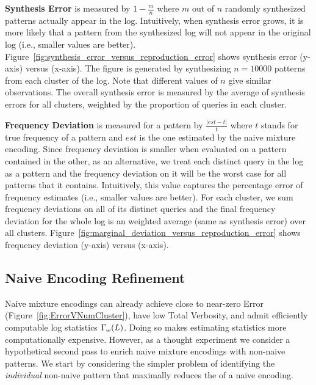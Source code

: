 \noindent \textbf{Synthesis Error}
is measured by $1-\frac{m}{n}$ where $m$ out of $n$ randomly synthesized patterns actually appear in the log.
Intuitively, when synthesis error grows, it is more likely that a pattern from the synthesized log will not appear in the original log (i.e., smaller values are better).
Figure~\ref{fig:synthesis_error_versus_reproduction_error} shows synthesis error (y-axis) versus \errorname (x-axis).
The figure is generated by synthesizing $n=10000$ patterns from each cluster of the log.
Note that different values of $n$ give similar observations.
The overall synthesis error is measured by the average of synthesis errors for all clusters, weighted by the proportion of queries in each cluster.

\noindent \textbf{Frequency Deviation}
is measured for a pattern by $\frac{|est-t|}{t}$ where $t$ stands for true frequency of a pattern and $est$ is the one estimated by the naive mixture encoding.
Since frequency deviation is smaller when evaluated on a pattern contained in the other, as an alternative, we treat each distinct query in the log as a pattern and the frequency deviation on it will be the worst case for all patterns that it contains.
Intuitively, this value captures the percentage error of frequency estimates (i.e., smaller values are better).
For each cluster, we sum frequency deviations on all of its distinct queries and the final frequency deviation for the whole log is an weighted average (same as synthesis error) over all clusters.
Figure~\ref{fig:marginal_deviation_versus_reproduction_error} shows frequency deviation (y-axis) versus \errorname (x-axis).

\subsection{Naive Encoding Refinement}
\label{sec:naivemixtureencodingrefinement}
Naive mixture encodings can already achieve close to near-zero Error (Figure~\ref{fig:ErrorVNumCluster}), have low Total Verbosity, and admit efficiently computable log statistics $\Gamma_\omega(L)$.
Doing so makes estimating statistics more computationally expensive.
However, as a thought experiment we consider a hypothetical second pass to enrich naive mixture encodings with non-naive patterns.
We start by considering the simpler problem of identifying the \emph{individual} non-naive pattern that maximally reduces the \errorname of a naive encoding.

